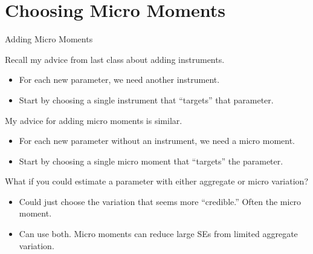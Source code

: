 \documentclass[aspectratio=169,t,11pt,table]{beamer}
\begin{document}
\section{Choosing Micro Moments}

\begin{frame}{Adding Micro Moments}
    \begin{wideitemize}
        \item Recall my advice from last class about adding instruments.
        \begin{itemize}
            \item For each new parameter, we need another instrument.
            \item Start by choosing a single instrument that ``targets'' that parameter.
        \end{itemize}
        \pause
        \item My advice for adding micro moments is similar.
        \begin{itemize}
            \item For each new parameter without an instrument, we need a micro moment.
            \item Start by choosing a single micro moment that ``targets'' the parameter.
        \end{itemize}
        \pause
        \item What if you could estimate a parameter with either aggregate or micro variation?
        \begin{itemize}
            \item Could just choose the variation that seems more ``credible.'' Often the micro moment.
            \item Can use both. Micro moments can reduce large SEs from limited aggregate variation.
        \end{itemize}
    \end{wideitemize}
\end{frame}
\end{document}
